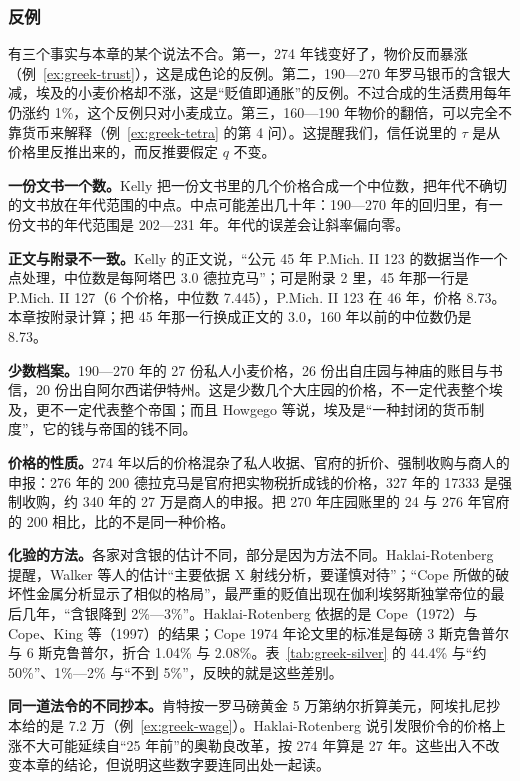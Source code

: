 \subsubsection{反例}
有三个事实与本章的某个说法不合。第一，274 年钱变好了，物价反而暴涨（例~\ref{ex:greek-trust}），这是成色论的反例。第二，190—270 年罗马银币的含银大减，埃及的小麦价格却不涨，这是“贬值即通胀”的反例。不过合成的生活费用每年仍涨约 1\%，这个反例只对小麦成立。第三，160—190 年物价的翻倍，可以完全不靠货币来解释（例~\ref{ex:greek-tetra} 的第 4 问）。这提醒我们，信任说里的 $\tau$ 是从价格里反推出来的，而反推要假定 $q$ 不变。

\begin{deeper}[这些数字有多可靠]
\textbf{一份文书一个数。}Kelly 把一份文书里的几个价格合成一个中位数，把年代不确切的文书放在年代范围的中点\cite{kelly2021}。中点可能差出几十年：190—270 年的回归里，有一份文书的年代范围是 202—231 年。年代的误差会让斜率偏向零。

\textbf{正文与附录不一致。}Kelly 的正文说，“公元 45 年 P.Mich. II 123 的数据当作一个点处理，中位数是每阿塔巴 3.0 德拉克马”\cite{kelly2021}；可是附录 2 里，45 年那一行是 P.Mich. II 127（6 个价格，中位数 7.445），P.Mich. II 123 在 46 年，价格 8.73。本章按附录计算；把 45 年那一行换成正文的 3.0，160 年以前的中位数仍是 8.73。

\textbf{少数档案。}190—270 年的 27 份私人小麦价格，26 份出自庄园与神庙的账目与书信，20 份出自阿尔西诺伊特州。这是少数几个大庄园的价格，不一定代表整个埃及，更不一定代表整个帝国；而且 Howgego 等说，埃及是“一种封闭的货币制度”\cite{howgego2010}，它的钱与帝国的钱不同。

\textbf{价格的性质。}274 年以后的价格混杂了私人收据、官府的折价、强制收购与商人的申报：276 年的 200 德拉克马是官府把实物税折成钱的价格，327 年的 17333 是强制收购，约 340 年的 27 万是商人的申报。把 270 年庄园账里的 24 与 276 年官府的 200 相比，比的不是同一种价格。

\textbf{化验的方法。}各家对含银的估计不同，部分是因为方法不同。Haklai-Rotenberg 提醒，Walker 等人的估计“主要依据 X 射线分析，要谨慎对待”；“Cope 所做的破坏性金属分析显示了相似的格局”，最严重的贬值出现在伽利埃努斯独掌帝位的最后几年，“含银降到 2\%—3\%”\cite{haklai2011}。Haklai-Rotenberg 依据的是 Cope（1972）与 Cope、King 等（1997）的结果；Cope 1974 年论文里的标准是每磅 3 斯克鲁普尔与 6 斯克鲁普尔，折合 1.04\% 与 2.08\%\cite{cope1974}。表~\ref{tab:greek-silver} 的 44.4\% 与“约 50\%”、1\%—2\% 与“不到 5\%”，反映的就是这些差别。

\textbf{同一道法令的不同抄本。}肯特按一罗马磅黄金 5 万第纳尔折算美元，阿埃扎尼抄本给的是 7.2 万（例~\ref{ex:greek-wage}）。Haklai-Rotenberg 说引发限价令的价格上涨不大可能延续自“25 年前”的奥勒良改革，按 274 年算是 27 年。这些出入不改变本章的结论，但说明这些数字要连同出处一起读。


\end{deeper}
